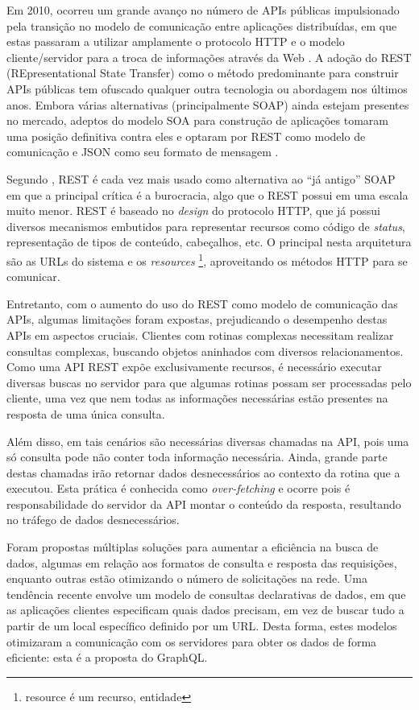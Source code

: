 Em 2010, ocorreu um grande avanço no número de APIs públicas impulsionado pela transição no modelo de comunicação entre aplicações distribuídas, em que estas passaram a utilizar amplamente o protocolo HTTP e o modelo cliente/servidor para a troca de informações através da Web \cite{tcc-ufsc}. A adoção do REST (REpresentational State Transfer) como o método predominante para construir APIs públicas tem ofuscado qualquer outra tecnologia ou abordagem nos últimos anos. Embora várias alternativas (principalmente SOAP) ainda estejam presentes no mercado, adeptos do modelo SOA para construção de aplicações tomaram uma posição definitiva contra eles e optaram por REST como modelo de comunicação e JSON como seu formato de mensagem \cite{programmableweb-rest-losing}.

Segundo , REST é cada vez mais usado como alternativa ao “já antigo” SOAP em que a principal crítica é a burocracia, algo que o REST possui em uma escala muito menor. REST é baseado no \textit{design} do protocolo HTTP, que já possui diversos mecanismos embutidos para representar recursos como código de \textit{status}, representação de tipos de conteúdo, cabeçalhos, etc. O principal nesta arquitetura são as URLs do sistema e os \textit{resources} \footnote{resource é um recurso, entidade}, aproveitando os métodos HTTP para se comunicar.

Entretanto, com o aumento do uso do REST como modelo de comunicação das APIs, algumas limitações foram expostas, prejudicando o desempenho destas APIs em aspectos cruciais. Clientes com rotinas complexas necessitam realizar consultas complexas, buscando objetos aninhados com diversos relacionamentos. Como uma API REST expõe exclusivamente recursos, é necessário executar diversas buscas no servidor para que algumas rotinas possam ser processadas pelo cliente, uma vez que nem todas as informações necessárias estão presentes na resposta de uma única consulta.

Além disso, em tais cenários são necessárias diversas chamadas na API, pois uma só consulta pode não conter toda informação necessária. Ainda, grande parte destas chamadas irão retornar dados desnecessários ao contexto da rotina que a executou. Esta prática é conhecida como \textit{over-fetching} e ocorre pois é responsabilidade do servidor da API montar o conteúdo da resposta, resultando no tráfego de dados desnecessários.

Foram propostas múltiplas soluções para aumentar a eficiência na busca de dados, algumas em relação aos formatos de consulta e resposta das requisições, enquanto outras estão otimizando o número de solicitações na rede. Uma tendência recente envolve um modelo de consultas declarativas de dados, em que as aplicações clientes especificam quais dados precisam, em vez de buscar tudo a partir de um local específico definido por um URL. Desta forma, estes modelos otimizaram a comunicação com os servidores para obter os dados de forma eficiente: esta é a proposta do GraphQL.

